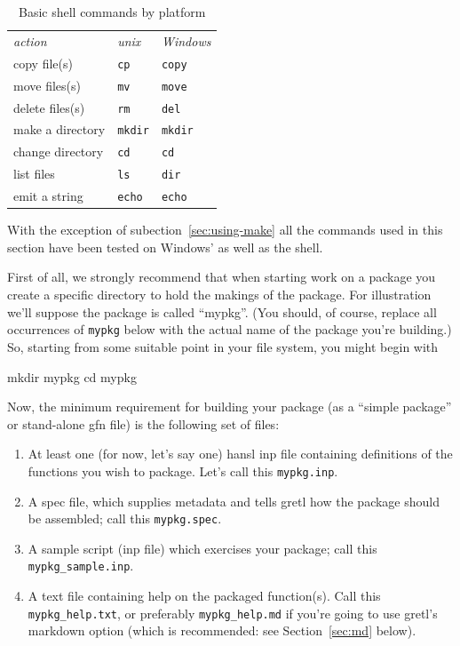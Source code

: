 \documentclass[oneside]{book}
\begin{document}
\begin{table}[htbp]
\centering
\begin{tabular}{lll}
\textit{action} & \textit{unix} & \textit{Windows} \\[4pt]
copy file(s) & \texttt{cp} & \texttt{copy} \\
move files(s) & \texttt{mv} & \texttt{move} \\
delete files(s) & \texttt{rm} & \texttt{del} \\
make a directory & \texttt{mkdir} & \texttt{mkdir} \\
change directory & \texttt{cd} & \texttt{cd} \\
list files & \texttt{ls} & \texttt{dir} \\
emit a string & \texttt{echo} & \texttt{echo}
\end{tabular}
\caption{Basic shell commands by platform}
\label{tab:basics}
\end{table}

With the exception of subection~\ref{sec:using-make} all the commands
used in this section have been tested on Windows'  as
well as the  shell.

First of all, we strongly recommend that when starting work on a
package you create a specific directory to hold the makings of the
package. For illustration we'll suppose the package is called
``mypkg''. (You should, of course, replace all occurrences of
\texttt{mypkg} below with the actual name of the package you're
building.) So, starting from some suitable point in your file system,
you might begin with
%
\begin{code}
mkdir mypkg
cd mypkg
\end{code}

Now, the minimum requirement for building your package (as a ``simple
package'' or stand-alone \textsf{gfn} file) is the following set of
files:
\begin{enumerate}
\item At least one (for now, let's say one) hansl \textsf{inp} file
  containing definitions of the functions you wish to package. Let's
  call this \texttt{mypkg.inp}.
\item A \textsf{spec} file, which supplies metadata and tells gretl how the
  package should be assembled; call this \texttt{mypkg.spec}.
\item A sample script (\textsf{inp} file) which exercises your
  package; call this \texttt{mypkg\_sample.inp}.
\item A text file containing help on the packaged function(s). Call
  this \texttt{mypkg\_help.txt}, or preferably \texttt{mypkg\_help.md}
  if you're going to use gretl's markdown option (which is
  recommended: see Section~\ref{sec:md} below).
\end{enumerate}
\end{document}
